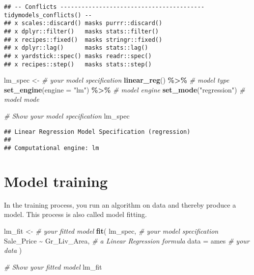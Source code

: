 \documentclass[
]{book}
\newenvironment{Shaded}{\begin{snugshade}}{\end{snugshade}}
\newcommand{\CommentTok}[1]{\textcolor[rgb]{0.56,0.35,0.01}{\textit{#1}}}
\newcommand{\DataTypeTok}[1]{\textcolor[rgb]{0.13,0.29,0.53}{#1}}
\newcommand{\KeywordTok}[1]{\textcolor[rgb]{0.13,0.29,0.53}{\textbf{#1}}}
\newcommand{\NormalTok}[1]{#1}
\newcommand{\OperatorTok}[1]{\textcolor[rgb]{0.81,0.36,0.00}{\textbf{#1}}}
\newcommand{\StringTok}[1]{\textcolor[rgb]{0.31,0.60,0.02}{#1}}
\begin{document}
\begin{verbatim}
## -- Conflicts ----------------------------------------- tidymodels_conflicts() --
## x scales::discard() masks purrr::discard()
## x dplyr::filter()   masks stats::filter()
## x recipes::fixed()  masks stringr::fixed()
## x dplyr::lag()      masks stats::lag()
## x yardstick::spec() masks readr::spec()
## x recipes::step()   masks stats::step()
\end{verbatim}

\begin{Shaded}
\begin{Highlighting}[]
\NormalTok{lm\_spec \textless{}{-}}\StringTok{ }\CommentTok{\# your model specification}
\StringTok{  }\KeywordTok{linear\_reg}\NormalTok{() }\OperatorTok{\%\textgreater{}\%}\StringTok{  }\CommentTok{\# model type}
\StringTok{  }\KeywordTok{set\_engine}\NormalTok{(}\DataTypeTok{engine =} \StringTok{"lm"}\NormalTok{) }\OperatorTok{\%\textgreater{}\%}\StringTok{  }\CommentTok{\# model engine}
\StringTok{  }\KeywordTok{set\_mode}\NormalTok{(}\StringTok{"regression"}\NormalTok{) }\CommentTok{\# model mode}

\CommentTok{\# Show your model specification}
\NormalTok{lm\_spec}
\end{Highlighting}
\end{Shaded}

\begin{verbatim}
## Linear Regression Model Specification (regression)
## 
## Computational engine: lm
\end{verbatim}

\hypertarget{model-training}{%
\section{Model training}\label{model-training}}

In the training process, you run an algorithm on data and thereby produce a model. This process is also called model fitting.

\begin{Shaded}
\begin{Highlighting}[]
\NormalTok{lm\_fit \textless{}{-}}\StringTok{ }\CommentTok{\# your fitted model}
\StringTok{  }\KeywordTok{fit}\NormalTok{( }
\NormalTok{  lm\_spec, }\CommentTok{\# your model specification }
\NormalTok{  Sale\_Price }\OperatorTok{\textasciitilde{}}\StringTok{ }\NormalTok{Gr\_Liv\_Area, }\CommentTok{\# a Linear Regression formula }
  \DataTypeTok{data =}\NormalTok{ ames }\CommentTok{\# your data}
\NormalTok{  )}

\CommentTok{\# Show your fitted model}
\NormalTok{lm\_fit}
\end{Highlighting}
\end{Shaded}
\end{document}

